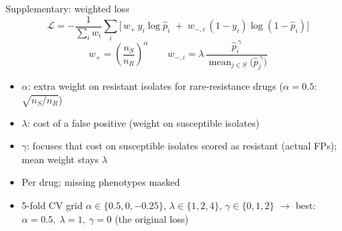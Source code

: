 \documentclass[pdf]{beamer} %
\begin{document}
\begin{frame}{Supplementary: weighted loss}
  \[
    \mathcal{L} = -\frac{1}{\sum_i w_i}\sum_i \Big[\, w_{+}\, y_i \log \hat{p}_i
      \;+\; w_{-,i}\,(1-y_i)\log(1-\hat{p}_i) \Big]
  \]
  \vspace{-0.5em}
  \[
    w_{+} = \left(\frac{n_S}{n_R}\right)^{\alpha}
    \qquad
    w_{-,i} = \lambda\,\frac{\hat{p}_i^{\,\gamma}}{\operatorname{mean}_{j \in S}\big(\hat{p}_j^{\,\gamma}\big)}
  \]
  \small
  \begin{itemize}
    \item $\alpha$: extra weight on resistant isolates for rare-resistance drugs ($\alpha=0.5$: $\sqrt{n_S/n_R}$)
    \item $\lambda$: cost of a false positive (weight on susceptible isolates)
    \item $\gamma$: focuses that cost on susceptible isolates scored as resistant (actual FPs); mean weight stays $\lambda$
    \item Per drug; missing phenotypes masked
    \item 5-fold CV grid $\alpha \in \{0.5, 0, -0.25\}$, $\lambda \in \{1, 2, 4\}$, $\gamma \in \{0, 1, 2\}$
          $\rightarrow$ best: $\alpha=0.5,\ \lambda=1,\ \gamma=0$ (the original loss)
  \end{itemize}
\end{frame}

% 
\end{document}
